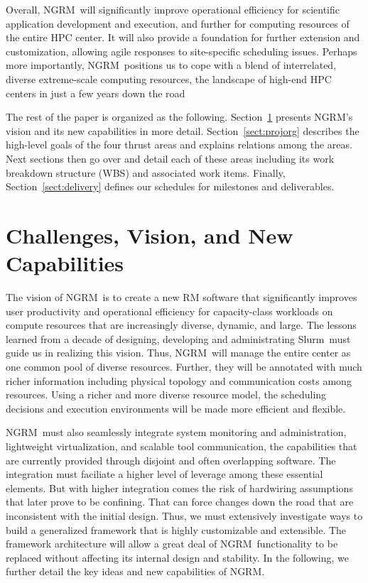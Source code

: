 \documentclass{article}
\newcommand{\ngrm}{NGRM}
\newcommand{\slurm}{Slurm}
\begin{document}
Overall, \ngrm\ will significantly improve operational efficiency for
scientific application development and execution, and further for computing
resources of the entire HPC center.  It will also provide
a foundation for further extension and customization, allowing agile responses
to site-specific scheduling issues. Perhaps more importantly, \ngrm\
positions us to cope with a blend of interrelated, diverse
extreme-scale computing resources, the landscape of high-end HPC centers
in just a few years down the road

The rest of the paper is organized as the following.
Section~\ref{sect:vision} presents \ngrm's vision and 
its new capabilities in more detail. Section~\ref{sect:projorg}  
describes the high-level goals of the four thrust areas and
explains relations among the areas. Next sections then 
go over and detail each of these areas including 
its work breakdown structure (WBS) and associated work items.
Finally, Section~\ref{sect:delivery} defines
our schedules for milestones and deliverables.


\section{Challenges, Vision, and New Capabilities}
\label{sect:vision}
The vision of \ngrm\ is to create a new RM software that 
significantly improves user productivity and operational efficiency 
for capacity-class workloads on compute resources that are increasingly 
diverse, dynamic, and large.
The lessons learned from a decade of designing, developing
and administrating \slurm\ must guide us in realizing this vision. 
Thus, \ngrm\ will manage the entire center as one common pool 
of diverse resources. Further, they will be annotated with much richer information 
including physical topology and communication costs among resources.
Using a richer and more diverse resource model,  
the scheduling decisions and execution environments will 
be made more efficient and flexible. 

\ngrm\ must also seamlessly integrate system monitoring
and administration, lightweight virtualization, and scalable tool 
communication, the capabilities that are currently provided through 
disjoint and often overlapping software. The integration must 
faciliate a higher level of leverage among these essential elements.
But with higher integration comes the risk of hardwiring assumptions 
that later prove to be confining. That can force changes down the road 
that are inconsistent with the initial design. Thus, we must extensively
investigate ways to build a generalized framework that is highly 
customizable and extensible. The framework architecture will allow
a great deal of \ngrm\ functionality to be replaced without 
affecting its internal design and stability.
In the following, we further detail the key ideas and new capabilities 
of \ngrm.
\end{document}
